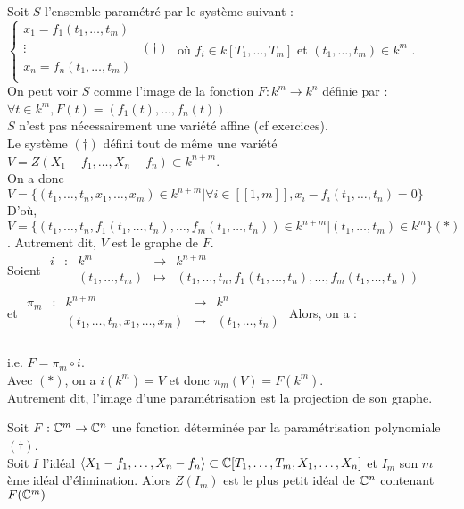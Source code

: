 Soit $S$ l'ensemble param\'etr\'e par le syst\`eme suivant : $ \begin{cases}
x_1=f_1(t_1,\ldots,t_m)& \\
\vdots & (\dagger) \\
x_n=f_n(t_1,\ldots,t_m)& \\
\end{cases} $ o\`u $f_i \in k[T_1,\ldots,T_m]$ et $(t_1,\ldots,t_m) \in k^m$ .\\
On peut voir $S$ comme l'image de la fonction $F : k^m \to k^n$ d\'efinie par : \\
$\forall t \in k^m, F(t)=(f_1(t),\ldots,f_n(t))$.\\
$S$ n'est pas n\'ecessairement une vari\'et\'e affine (cf exercices).\\
Le syst\`eme $(\dagger)$ d\'efini tout de même une vari\'et\'e $V=Z(X_1-f_1,\ldots,X_n-f_n) \subset k^{n+m}$.\\
On a donc $V=\{(t_1,\ldots,t_n,x_1,\ldots,x_m)\in k^{n+m} | \forall i \in [\![1,m]\!],x_i-f_i(t_1,\ldots,t_n)=0 \}$\\
D'o\`u,  $V=\{(t_1,\ldots,t_n,f_1(t_1,\ldots,t_n),\ldots,f_m(t_1,\ldots,t_n))\in k^{n+m} | (t_1,\ldots,t_m) \in k^m \} (*)$. Autrement dit, $V$ est le graphe de $F$.\\
Soient $\begin{array}{ccccc}
i & : & k^m & \to & k ^{n+m} \\
 & & (t_1,\ldots,t_m) & \mapsto & (t_1,\ldots,t_n,f_1(t_1,\ldots,t_n),\ldots,f_m(t_1,\ldots,t_n))\\
\end{array}$\\
 et $\begin{array}{ccccc}
\pi_m & : & k^{n+m} & \to & k^n \\
 & & (t_1,\ldots,t_n,x_1,\ldots,x_m) & \mapsto & (t_1,\ldots,t_n) \\
\end{array}$
Alors, on a : \\
 \\
i.e. $F=\pi_m \circ i$.\\
Avec $(*)$, on a $i(k^m)=V$ et donc $\pi_m(V)=F(k^m)$.\\
Autrement dit, l'image d'une param\'etrisation est la projection de son graphe.
\begin{Thm}
Soit $F:\mathbb{C}^m \to \mathbb{C}^n$ une fonction d\'etermin\'ee par la param\'etrisation polynomiale $(\dagger)$.\\ Soit $I$ l'id\'eal $\left\langle X_1-f_1,\ldots,X_n-f_n \right\rangle \subset \mathbb{C}[T_1,\ldots,T_m,X_1,\ldots,X_n]$ et $I_m$ son $m$ \`eme id\'eal d'\'elimination. Alors $Z(I_m)$ est le plus petit id\'eal de $\mathbb{C}^n$ contenant $F(\mathbb{C}^m)$
\end{Thm}